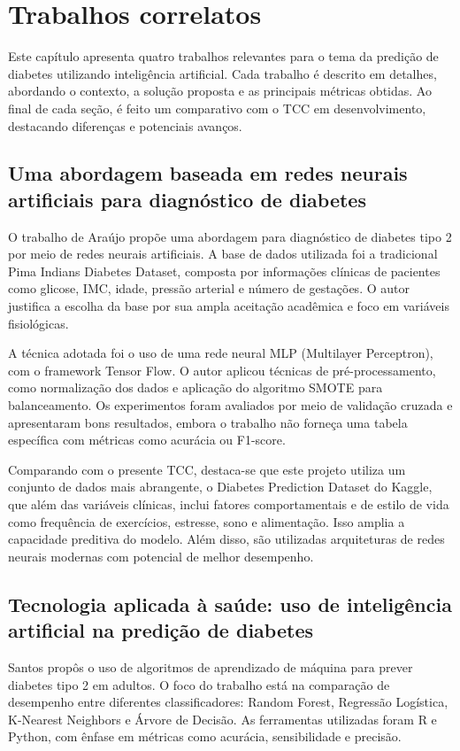 \chapter{Trabalhos correlatos}
Este capítulo apresenta quatro trabalhos relevantes para o tema da predição de diabetes utilizando inteligência artificial. Cada trabalho é descrito em detalhes, abordando o contexto, a solução proposta e as principais métricas obtidas. Ao final de cada seção, é feito um comparativo com o TCC em desenvolvimento, destacando diferenças e potenciais avanços.

\section{Uma abordagem baseada em redes neurais artificiais para diagnóstico de diabetes}
O trabalho de Araújo \cite{Araujo2021} propõe uma abordagem para diagnóstico de diabetes tipo 2 por meio de redes neurais artificiais. A base de dados utilizada foi a tradicional Pima Indians Diabetes Dataset, composta por informações clínicas de pacientes como glicose, IMC, idade, pressão arterial e número de gestações. O autor justifica a escolha da base por sua ampla aceitação acadêmica e foco em variáveis fisiológicas.

A técnica adotada foi o uso de uma rede neural MLP (Multilayer Perceptron), com o framework Tensor Flow. O autor aplicou técnicas de pré-processamento, como normalização dos dados e aplicação do algoritmo SMOTE para balanceamento. Os experimentos foram avaliados por meio de validação cruzada e apresentaram bons resultados, embora o trabalho não forneça uma tabela específica com métricas como acurácia ou F1-score.

Comparando com o presente TCC, destaca-se que este projeto utiliza um conjunto de dados mais abrangente, o Diabetes Prediction Dataset do Kaggle, que além das variáveis clínicas, inclui fatores comportamentais e de estilo de vida como frequência de exercícios, estresse, sono e alimentação. Isso amplia a capacidade preditiva do modelo. Além disso, são utilizadas arquiteturas de redes neurais modernas com potencial de melhor desempenho.

\section{Tecnologia aplicada à saúde: uso de inteligência artificial na predição de diabetes}
Santos \cite{Santos2024} propôs o uso de algoritmos de aprendizado de máquina para prever diabetes tipo 2 em adultos. O foco do trabalho está na comparação de desempenho entre diferentes classificadores: Random Forest, Regressão Logística, K-Nearest Neighbors e Árvore de Decisão. As ferramentas utilizadas foram R e Python, com ênfase em métricas como acurácia, sensibilidade e precisão.

